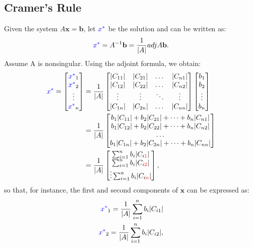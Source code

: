 \documentclass[10pt,a4paper]{book}
\newcommand{\red}[1]{\textcolor{red}{#1}}
\newcommand{\blue}[1]{\textcolor{blue}{#1}}
\theoremstyle{definition}\newtheorem{definition}{Definition}
\theoremstyle{definition}\newtheorem{fact}{Fact}
\theoremstyle{definition}\newtheorem{ex}{Ex.}
\theoremstyle{definition}\newtheorem{project}{Project}
\theoremstyle{definition}\newtheorem{problem}{Problem}
\theoremstyle{definition}\newtheorem{example}{Example}
\numberwithin{theorem}{chapter}
\numberwithin{corollary}{chapter}
\numberwithin{assumption}{chapter}
\numberwithin{definition}{chapter}
\numberwithin{prop}{chapter}
\numberwithin{notation}{chapter}
\numberwithin{problem}{chapter}
\numberwithin{example}{chapter}
\numberwithin{fact}{chapter}
\numberwithin{ex}{chapter}
\def\b{\mathbf b}
\def\x{\mathbf x}
\begin{document}
	\subsection{Cramer's Rule}
	Given the system $A\x = \b$, let $\blue{x^*}$ be the solution and can be written as:
	\begin{equation*}
		\blue{x^*} = A^{-1}\b = \frac{1}{|A|} adj A \b.
	\end{equation*}
	Assume A is nonsingular. Using the adjoint formula, we obtain:
	\begin{align*}
		\blue{x^*} = \begin{bmatrix}
			\blue{x^*}_1 \\
			\blue{x^*}_2 \\
			\vdots \\
			\blue{x^*}_n
		\end{bmatrix}
		&= \frac{1}{|A|} 
		\begin{bmatrix}
			|C_{11}| & |C_{21}| & \dots  & |C_{n1}| \\
			|C_{12}| & |C_{22}| & \dots  & |C_{n2}| \\
			\vdots   & \vdots   & \ddots & \vdots   \\
			|C_{1n}| & |C_{2n}| & \dots  & |C_{nn}| 
		\end{bmatrix} 
		\begin{bmatrix}
			b_1 \\
			b_2 \\
			\vdots  \\
			b_n
		\end{bmatrix} \\
		&=\frac{1}{|A|}
		\begin{bmatrix}
			b_1|C_{11}| + b_2|C_{21}| + \dots + b_n|C_{n1}| \\
			b_1|C_{12}| + b_2|C_{22}| + \dots + b_n|C_{n2}| \\
			\dots  \\
			b_1|C_{1n}| + b_2|C_{2n}| + \dots + b_n|C_{nn}|
		\end{bmatrix} \\
		&= \frac{1}{|A|}
		\begin{bmatrix}
			\sum^n_{i=1} b_i |C_{i\red{1}}| \\
			\sum^n_{i=1} b_i |C_{i\red{2}}| \\
			\vdots 
			\sum^n_{i=1} b_i |C_{i\red{n}}|
		\end{bmatrix},
	\end{align*}
	so that, for instance, the first and second components of $\x$ can be expressed as:
	\begin{align*}
		\blue{x^*}_1 = \frac{1}{|A|}\sum^n_{i=1} b_i |C_{i1}|  \\
		\blue{x^*}_2 = \frac{1}{|A|}\sum^n_{i=1} b_i |C_{i2}|, 
	\end{align*}
\end{document}

